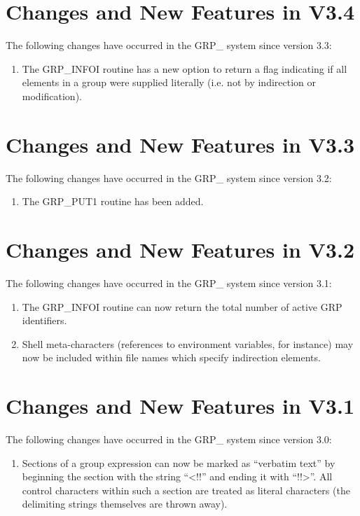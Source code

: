 \section{Changes and New Features in V3.4}
The following changes have occurred in the GRP\_ system since version 3.3:

\begin{enumerate}
\item The GRP\_INFOI routine has a new option to return a flag indicating
if all elements in a group were supplied literally (i.e. not by
indirection or modification).
\end{enumerate}

\section{Changes and New Features in V3.3}
The following changes have occurred in the GRP\_ system since version 3.2:

\begin{enumerate}
\item The GRP\_PUT1 routine has been added.
\end{enumerate}

\section{Changes and New Features in V3.2}
The following changes have occurred in the GRP\_ system since version 3.1:

\begin{enumerate}
\item The GRP\_INFOI routine can now return the total number of active
GRP identifiers.
\item Shell meta-characters (references to environment variables, for
instance) may now be included within file names which specify
indirection elements.

\end{enumerate}

\section{Changes and New Features in V3.1}
The following changes have occurred in the GRP\_ system since version 3.0:

\begin{enumerate}

\item Sections of a group expression can now be marked as ``verbatim text''
by beginning the section with the string ``<!!'' and ending it with
``!!>''. All control characters within such a section are treated as
literal characters (the delimiting strings themselves are thrown away).
\end{enumerate}

